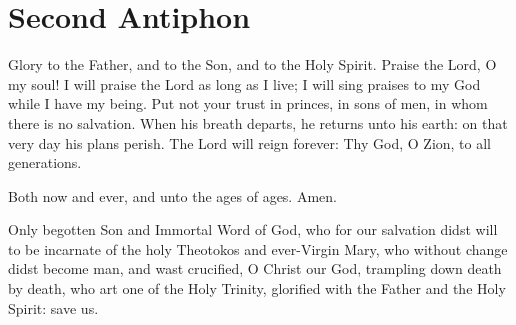 \section{Second Antiphon}

\begin{hymn}
    Glory to the Father, and to the Son, and to the Holy Spirit. Praise the Lord, O my soul! I will praise the Lord as long as I live; I will sing praises to my God while I have my being. Put not your trust in princes, in sons of men, in whom there is no salvation. When his breath departs, he returns unto his earth: on that very day his plans perish. The Lord will reign forever: Thy God, O Zion, to all generations.

    Both now and ever, and unto the ages of ages. Amen.
    
    Only begotten Son and Immortal Word of God, who for our salvation didst will to be incarnate of the holy Theotokos and ever-Virgin Mary, who without change didst become man, and wast crucified, O Christ our God, trampling down death by death, who art one of the Holy Trinity, glorified with the Father and the Holy Spirit: save us.
\end{hymn}